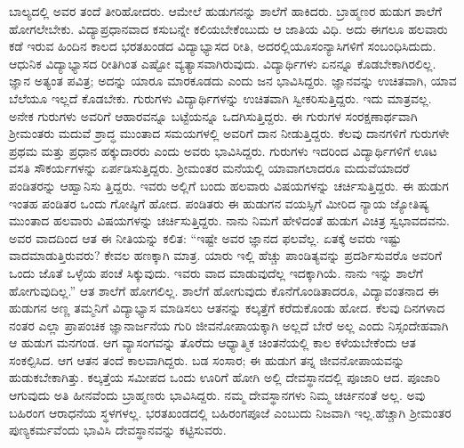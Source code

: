 ಬಾಲ್ಯದಲ್ಲಿ ಅವರ ತಂದೆ ತೀರಿಹೋದರು. ಆಮೇಲೆ ಹುಡುಗನನ್ನು ಶಾಲೆಗೆ ಹಾಕಿದರು. ಬ್ರಾಹ್ಮಣರ ಹುಡುಗ ಶಾಲೆಗೆ ಹೋಗಲೇಬೇಕು. ವಿದ್ಯಾಪ್ರಧಾನವಾದ ಕಸುಬನ್ನೇ ಕಲಿಯಬೇಕೆಂಬುದು ಆ ಜಾತಿಯ ವಿಧಿ. ಅದು ಈಗಲೂ ಹಲವಾರು ಕಡೆ ಇರುವ ಹಿಂದಿನ ಕಾಲದ ಭರತಖಂಡದ ವಿದ್ಯಾಭ್ಯಾಸದ ರೀತಿ, ಅದರಲ್ಲಿಯೂಸಂನ್ಯಾಸಿಗಳಿಗೆ ಸಂಬಂಧಿಸಿದುದು. ಆಧುನಿಕ ವಿದ್ಯಾಭ್ಯಾಸದ ರೀತಿಗಿಂತ ಎಷ್ಟೋ ವ್ಯತ್ಯಾಸವಾಗಿರುವುದು. ವಿದ್ಯಾರ್ಥಿಗಳು ಏನನ್ನೂ ಕೊಡಬೇಕಾಗಿರಲಿಲ್ಲ. ಜ್ಞಾನ ಅತ್ಯಂತ ಪವಿತ್ರ; ಅದನ್ನು ಯಾರೂ ಮಾರಕೂಡದು ಎಂದು ಜನ ಭಾವಿಸಿದ್ದರು. ಜ್ಞಾನವನ್ನು ಉಚಿತವಾಗಿ, ಯಾವ ಬೆಲೆಯೂ ಇಲ್ಲದೆ ಕೊಡಬೇಕು. ಗುರುಗಳು ವಿದ್ಯಾರ್ಥಿಗಳನ್ನು ಉಚಿತವಾಗಿ ಸ್ವೀಕರಿಸುತ್ತಿದ್ದರು. ಇದು ಮಾತ್ರವಲ್ಲ. ಅನೇಕ ಗುರುಗಳು ಅವರಿಗೆ ಆಹಾರವನ್ನೂ ಬಟ್ಟೆಯನ್ನೂ ಒದಗಿಸುತ್ತಿದ್ದರು. ಈ ಗುರುಗಳ ಸಂರಕ್ಷಣಾರ್ಥವಾಗಿ ಶ‍್ರೀಮಂತರು ಮದುವೆ ಶ್ರಾದ್ಧ ಮುಂತಾದ ಸಮಯಗಳಲ್ಲಿ ಅವರಿಗೆ ದಾನ ನೀಡುತ್ತಿದ್ದರು. ಕೆಲವು ದಾನಗಳಿಗೆ ಗುರುಗಳೇ ಪ್ರಥಮ ಮತ್ತು ಪ್ರಧಾನ ಹಕ್ಕುದಾರರು ಎಂದು ಅವರು ಭಾವಿಸಿದ್ದರು. ಗುರುಗಳು ಇದರಿಂದ ವಿದ್ಯಾರ್ಥಿಗಳಿಗೆ ಊಟ ವಸತಿ ಸೌಕರ್ಯಗಳನ್ನು ಏರ್ಪಡಿಸುತ್ತಿದ್ದರು. ಶ‍್ರೀಮಂತರ ಮನೆಯಲ್ಲಿ ಯಾವಾಗಲಾದರೂ ಮದುವೆಯಾದರೆ ಪಂಡಿತರನ್ನು ಆಹ್ವಾನಿಸು ತ್ತಿದ್ದರು. ಇವರು ಅಲ್ಲಿಗೆ ಬಂದು ಹಲವಾರು ವಿಷಯಗಳನ್ನು ಚರ್ಚಿಸುತ್ತಿದ್ದರು. ಈ ಹುಡುಗ ಇಂತಹ ಪಂಡಿತರ ಒಂದು ಗೋಷ್ಠಿಗೆ ಹೋದ. ಪಂಡಿತರು ಈ ಹುಡುಗನ ವಯಸ್ಸಿಗೆ ಮೀರಿದ ನ್ಯಾಯ ಜ್ಯೋತಿಷ್ಯ ಮುಂತಾದ ಹಲವಾರು ವಿಷಯಗಳನ್ನು ಚರ್ಚಿಸುತ್ತಿದ್ದರು. ನಾನು ನಿಮಗೆ ಹೇಳಿದಂತೆ ಹುಡುಗ ವಿಚಿತ್ರ ಸ್ವಭಾವದವನು. ಅವರ ವಾದದಿಂದ ಆತ ಈ ನೀತಿಯನ್ನು ಕಲಿತ: “ಇಷ್ಟೇ ಅವರ ಜ್ಞಾನದ ಫಲವೆಲ್ಲ. ಏತಕ್ಕೆ ಅವರು ಇಷ್ಟು ವಾದಮಾಡುತ್ತಿರುವರು? ಕೇವಲ ಹಣಕ್ಕಾಗಿ ಮಾತ್ರ. ಯಾರು ಇಲ್ಲಿ ಹೆಚ್ಚು ಪಾಂಡಿತ್ಯವನ್ನು ಪ್ರದರ್ಶಿಸುವರೊ ಅವರಿಗೆ ಒಂದು ಜೊತೆ ಒಳ್ಳೆಯ ಪಂಚೆ ಸಿಕ್ಕುವುದು. ಇವರು ವಾದ ಮಾಡುವುದೆಲ್ಲ ಇದಕ್ಕಾಗಿಯೆ. ನಾನು ಇನ್ನು ಶಾಲೆಗೆ ಹೋಗುವುದಿಲ್ಲ.” ಆತ ಶಾಲೆಗೆ ಹೋಗಲಿಲ್ಲ. ಶಾಲೆಗೆ ಹೋಗುವುದು ಕೊನೆಗೊಂಡಿತಾದರೂ, ವಿದ್ಯಾವಂತನಾದ ಈ ಹುಡುಗನ ಅಣ್ಣ ತಮ್ಮನಿಗೆ ವಿದ್ಯಾಭ್ಯಾಸ ಮಾಡಿಸಲು ಆತನನ್ನು ಕಲ್ಕತ್ತೆಗೆ ಕರೆದುಕೊಂಡು ಹೋದ. ಕೆಲವು ದಿನಗಳಾದ ನಂತರ ಎಲ್ಲಾ ಪ್ರಾಪಂಚಿಕ ಜ್ಞಾನಾರ್ಜನೆಯ ಗುರಿ ಜೀವನೋಪಾಯಕ್ಕಾಗಿ ಅಲ್ಲದೆ ಬೇರೆ ಅಲ್ಲ ಎಂದು ನಿಸ್ಸಂದೇಹವಾಗಿ ಆ ಹುಡುಗ ಮನಗಂಡ. ಆಗ ವ್ಯಾಸಂಗವನ್ನು ತೊರೆದು ಆಧ್ಯಾತ್ಮಿಕ ಚಿಂತನೆಯಲ್ಲಿ ಕಾಲ ಕಳೆಯಬೇಕೆಂದು ಆತ ಸಂಕಲ್ಪಿಸಿದ. ಆಗ ಆತನ ತಂದೆ ಕಾಲವಾಗಿದ್ದರು. ಬಡ ಸಂಸಾರ; ಈ ಹುಡುಗ ತನ್ನ ಜೀವನೋಪಾಯವನ್ನು ಹುಡುಕಬೇಕಾಗಿತ್ತು. ಕಲ್ಕತ್ತೆಯ ಸಮೀಪದ ಒಂದು ಊರಿಗೆ ಹೋಗಿ ಅಲ್ಲಿ ದೇವಸ್ಥಾನದಲ್ಲಿ ಪೂಜಾರಿ ಆದ. ಪೂಜಾರಿ ಆಗುವುದು ಅತಿ ಹೀನವೆಂದು ಬ್ರಾಹ್ಮಣರು ಭಾವಿಸಿದ್ದರು. ನಮ್ಮ ದೇವಸ್ಥಾನಗಳು ನಿಮ್ಮ ಚರ್ಚಿನಂತೆ ಅಲ್ಲ. ಅವು ಬಹಿರಂಗ ಆರಾಧನೆಯ ಸ್ಥಳಗಳಲ್ಲ. ಭರತಖಂಡದಲ್ಲಿ ಬಹಿರಂಗಪೂಜೆ ಎಂಬುದು ನಿಜವಾಗಿ ಇಲ್ಲ.ಹೆಚ್ಚಾಗಿ ಶ‍್ರೀಮಂತರ ಪುಣ್ಯಕರ್ಮವೆಂದು ಭಾವಿಸಿ ದೇವಸ್ಥಾನವನ್ನು ಕಟ್ಟಿಸುವರು.

